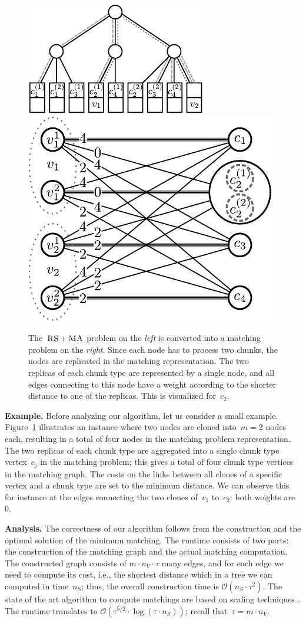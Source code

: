 \documentclass[preprint,12pt]{elsarticle}
\newcommand{\MaFactor}{m}
\newcommand{\ChunkType}{\tau}
\newcommand{\VirtualNode}{v}
\newcommand{\achunk}{\ensuremath{c}}
\newcommand{\RS}{\textsc{RS}}
\newcommand{\MA}{\textsc{MA}}
\begin{document}
\begin{figure}
\includegraphics[width = 0.49\columnwidth]{figs/model_ma_r_cv_boxes}
\hfill
\includegraphics[width =0.49\columnwidth]{figs/matching}
\caption{The~$\RS+\MA$ problem on the \emph{left} is converted into a
matching problem on the \emph{right}. Since each node has to process two
chunks, the
nodes are replicated in the matching representation. The two replicas of each
chunk type are represented by a single node, and all edges connecting to this
node have a weight according to the shorter distance to one of the replicas.
This is visualized for~$\achunk_2$.}
\label{fig:matching}
\end{figure}

\textbf{Example.} Before analyzing our algorithm, let us consider a small example.
Figure~\ref{fig:matching} illustrates
an instance where two nodes are
cloned into~$\MaFactor = 2$ nodes each,
resulting in a total of four nodes in
the matching problem representation.
The two replicas of each chunk type are
aggregated into a single chunk type vertex~$\achunk_j$  in the matching problem;
this gives a total of four chunk type vertices in the matching graph. The costs
on the links between all clones of a specific vertex and a chunk type are set to
the minimum distance. We can observe this for instance at the edges connecting
the two clones of~$\VirtualNode_1$ to~$\achunk_2$: both weights are 0.

\textbf{Analysis.}
The correctness of our algorithm follows from the construction and the optimal
solution of the minimum matching.
The runtime consists of two parts: the construction of the matching graph and
the actual matching computation. The constructed graph consists of
$\MaFactor \cdot n_V \cdot \ChunkType$
many edges,
and for each edge we need to compute its cost, i.e., the shortest distance
which in a tree we can computed in time~$n_S$; thus, the overall construction time
is
$\mathcal{O}(n_S \cdot \tau^2)$.
The state of the art algorithm to compute matchings are based on scaling techniques~\cite{scale-match}.
The runtime translates to
$\mathcal{O}(\tau^{5/2}\cdot \log(\tau\cdot n_S))$; recall that~$\tau = \MaFactor\cdot n_V$.
\end{document}
